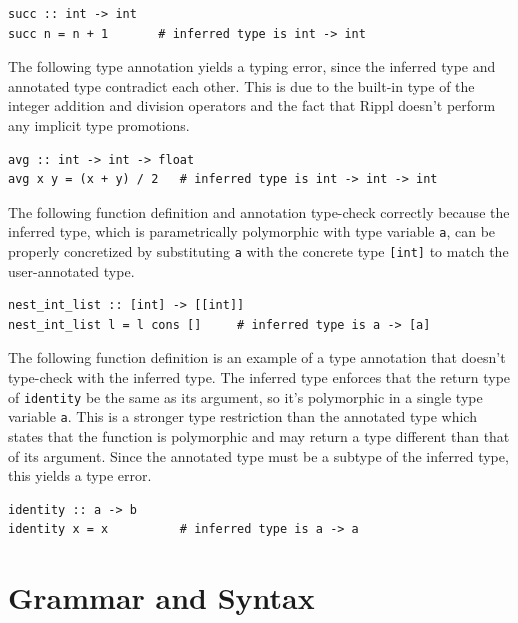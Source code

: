 \documentclass[5pt]{article}
\begin{document}
\begin{lstlisting}[language=rippl]
succ :: int -> int
succ n = n + 1       # inferred type is int -> int
\end{lstlisting}

\noindent The following type annotation yields a typing error, since the inferred type and annotated type contradict each other. This is due to the built-in type of the integer addition and division operators and the fact that Rippl doesn't perform any implicit type promotions. \\

\begin{lstlisting}[language=rippl]
avg :: int -> int -> float
avg x y = (x + y) / 2   # inferred type is int -> int -> int
\end{lstlisting}

\noindent The following function definition and annotation type-check correctly because the inferred type, which is parametrically polymorphic with type variable \texttt{a}, can be properly concretized by substituting \texttt{a} with the concrete type \texttt{[int]} to match the user-annotated type. \\

\begin{lstlisting}[language=rippl]
nest_int_list :: [int] -> [[int]]
nest_int_list l = l cons []     # inferred type is a -> [a]
\end{lstlisting}

\noindent The following function definition is an example of a type annotation that doesn't type-check with the inferred type. The inferred type enforces that the return type of \texttt{identity} be the same as its argument, so it's polymorphic in a single type variable \texttt{a}. This is a stronger type restriction than the annotated type which states that the function is polymorphic and may return a type different than that of its argument. Since the annotated type must be a subtype of the inferred type, this yields a type error. \\

\begin{lstlisting}[language=rippl]
identity :: a -> b
identity x = x          # inferred type is a -> a
\end{lstlisting}
\pagebreak

\section{Grammar and Syntax}
\end{document}
